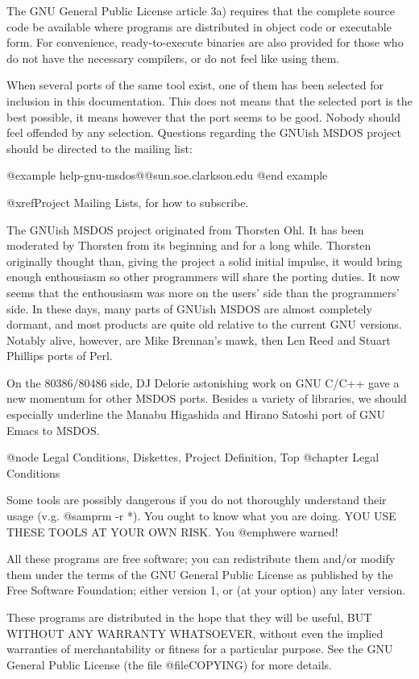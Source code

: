 The GNU General Public License article 3a) requires that the complete
source code be available where programs are distributed in object code
or executable form.  For convenience, ready-to-execute binaries are also
provided for those who do not have the necessary compilers, or do not
feel like using them.

When several ports of the same tool exist, one of them has been selected
for inclusion in this documentation.  This does not means that the
selected port is the best possible, it means however that the port seems
to be good.  Nobody should feel offended by any selection.  Questions
regarding the GNUish MSDOS project should be directed to the mailing
list:

@example
help-gnu-msdos@@sun.soe.clarkson.edu
@end example

@xref{Project Mailing Lists}, for how to subscribe.

The GNUish MSDOS project originated from Thorsten Ohl.  It has been
moderated by Thorsten from its beginning and for a long while.  Thorsten
originally thought than, giving the project a solid initial impulse, it
would bring enough enthousiasm so other programmers will share the
porting duties.  It now seems that the enthousiasm was more on the
users' side than the programmers' side.  In these days, many parts of
GNUish MSDOS are almost completely dormant, and most products are quite
old relative to the current GNU versions.  Notably alive, however, are
Mike Brennan's mawk, then Len Reed and Stuart Phillips ports of Perl.

On the 80386/80486 side, DJ Delorie astonishing work on GNU C/C++ gave a
new momentum for other MSDOS ports.  Besides a variety of libraries, we
should especially underline the Manabu Higashida and Hirano Satoshi port
of GNU Emacs to MSDOS.


@node Legal Conditions, Diskettes, Project Definition, Top
@chapter Legal Conditions

Some tools are possibly dangerous if you do not thoroughly understand
their usage (v.g. @samp{rm -r *}).  You ought to know what you are doing.
YOU USE THESE TOOLS AT YOUR OWN RISK.  You @emph{were} warned!

All these programs are free software; you can redistribute them and/or
modify them under the terms of the GNU General Public License as
published by the Free Software Foundation; either version 1, or (at
your option) any later version.

These programs are distributed in the hope that they will be useful, BUT
WITHOUT ANY WARRANTY WHATSOEVER, without even the implied warranties of
merchantability or fitness for a particular purpose.  See the GNU
General Public License (the file @file{COPYING}) for more details.

